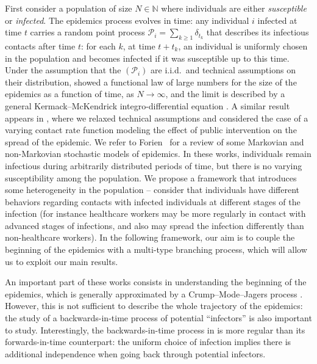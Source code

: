 First consider a population of size $N\in \mathbb{N}$ where
individuals are either \emph{susceptible} or \emph{infected}. The
epidemics process evolves in time: any individual $i$ infected at time
$t$ carries a random point process
$\mathcal{P}_i=\sum_{k\geq 1} \delta_{t_k}$ that describes its
infectious contacts after time $t$: for each $k$, at time $t+t_k$, an
individual is uniformly chosen in the population and becomes infected
if it was susceptible up to this time. Under the assumption that the
$(\mathcal{P}_i)$ are i.i.d.\ and technical assumptions on their
distribution, \citet{BR13} showed a functional law of large numbers
for the size of the epidemics as a function of time, as $N\to \infty$,
and the limit is described by a general Kermack--McKendrick
integro-differential equation \citep{KM27}. A similar result appears
in \citet{duchamps_general_2023}, where we relaxed technical
assumptions and considered the case of a varying contact rate function
modeling the effect of public intervention on the spread of the
epidemic. We refer to Forien~\cite{forien2022recentadvancesepidemicmodeling}
for a review of some Markovian and non-Markovian stochastic models of
epidemics. In these works, individuals remain infectious during
arbitrarily distributed periods of time, but there is no varying
susceptibility among the population. We propose a framework that
introduces some heterogeneity in the population -- consider that
individuals have different behaviors regarding contacts with infected
individuals at different stages of the infection (for instance
healthcare workers may be more regularly in contact with advanced
stages of infections, and also may spread the infection differently
than non-healthcare workers). In the following framework, our aim is
to couple the beginning of the epidemics with a multi-type branching
process, which will allow us to exploit our main results.

An important part of these works consists in understanding the
beginning of the epidemics, which is generally approximated by a
Crump--Mode--Jagers process \citep{jagers_general_2008}. However, this
is not sufficient to describe the whole trajectory of the epidemics:
the study of a backwards-in-time process of potential
``infectors'' is also important to study. Interestingly, the
backwards-in-time process in \citet{duchamps_general_2023} is more
regular than its forwards-in-time counterpart: the uniform choice of
infection implies there is additional independence when going back
through potential infectors.

